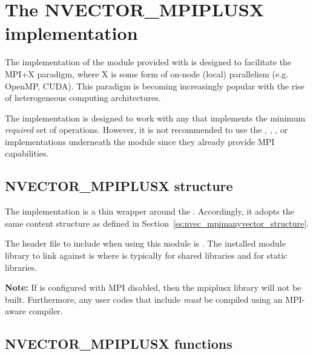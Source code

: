 %
\section{The NVECTOR\_MPIPLUSX implementation}\label{ss:nvec_mpiplusx}

The {\nvecmpiplusx} implementation of the {\nvector} module provided
with {\sundials} is designed to facilitate the MPI+X paradigm, where
X is some form of on-node (local) parallelism (e.g. OpenMP, CUDA).
This paradigm is becoming increasingly popular with the rise of
heterogeneous computing architectures.

The {\nvecmpiplusx} implementation is designed to work with any {\nvector} that
implements the minimum \emph{required} set of operations. However, it is not
recommended to use the {\nvecp}, {\nvecph}, {\nvecpetsc}, or {\nvectrilinos}
implementations underneath the {\nvecmpiplusx} module since they already provide
MPI capabilities.

\subsection{NVECTOR\_MPIPLUSX structure}
\label{ss:nvec_mpiplusx_structure}

The {\nvecmpiplusx} implementation is a thin wrapper around the
{\nvecmpimanyvector}. Accordingly, it adopts the same content structure
as defined in Section~\ref{ss:nvec_mpimanyvector_structure}. 

The header file to include when using this module is
. The installed module library to link against is
 where  is typically
 for shared libraries and  for static libraries.

\warn\textbf{Note:} If {\sundials} is configured with MPI disabled, then the
mpiplusx library will not be built.  Furthermore, any user codes
that include  \emph{must} be compiled
using an MPI-aware compiler.

\subsection{NVECTOR\_MPIPLUSX functions}
\label{ss:nvec_mpiplusx_functions}

